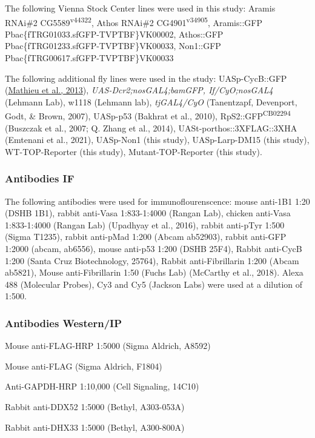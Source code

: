 \documentclass[12pt,oneside]{reedthesis}
\begin{document}
The following Vienna Stock Center lines were used in this study: Aramis RNAi\#2 CG5589\textsuperscript{v44322}, Athos RNAi\#2 CG4901\textsuperscript{v34905}, Aramis::GFP Pbac\{fTRG01033.sfGFP-TVPTBF\}VK00002, Athos::GFP Pbac\{fTRG01233.sfGFP-TVPTBF\}VK00033, Non1::GFP Pbac\{fTRG00617.sfGFP-TVPTBF\}VK00033

The following additional fly lines were used in the study: UASp-CycB::GFP (\href{https://www.ncbi.nlm.nih.gov/pmc/articles/PMC5830152/\#R25}{Mathieu et al., 2013}), \emph{UAS-Dcr2;nosGAL4;bamGFP, If/CyO;nosGAL4} (Lehmann Lab), w1118 (Lehmann lab), \emph{tjGAL4/CyO} (Tanentzapf, Devenport, Godt, \& Brown, 2007), UASp-p53 (Bakhrat et al., 2010), RpS2::GFP\textsuperscript{CB02294} (Buszczak et al., 2007; Q. Zhang et al., 2014), UASt-porthos::3XFLAG::3XHA (Emtenani et al., 2021), UASp-Non1 (this study), UASp-Larp-DM15 (this study), WT-TOP-Reporter (this study), Mutant-TOP-Reporter (this study).

\hypertarget{antibodies-if}{%
\subsubsection{Antibodies IF}\label{antibodies-if}}

The following antibodies were used for immunoflourenscence: mouse anti-1B1 1:20 (DSHB 1B1), rabbit anti-Vasa 1:833-1:4000 (Rangan Lab), chicken anti-Vasa 1:833-1:4000 (Rangan Lab) (Upadhyay et al., 2016), rabbit anti-pTyr 1:500 (Sigma T1235), rabbit anti-pMad 1:200 (Abcam ab52903), rabbit anti-GFP 1:2000 (abcam, ab6556), mouse anti-p53 1:200 (DSHB 25F4), Rabbit anti-CycB 1:200 (Santa Cruz Biotechnology, 25764), Rabbit anti-Fibrillarin 1:200 (Abcam ab5821), Mouse anti-Fibrillarin 1:50 (Fuchs Lab) (McCarthy et al., 2018). Alexa 488 (Molecular Probes), Cy3 and Cy5 (Jackson Labs) were used at a dilution of 1:500.

\hypertarget{antibodies-westernip}{%
\subsubsection{Antibodies Western/IP}\label{antibodies-westernip}}

Mouse anti-FLAG-HRP 1:5000 (Sigma Aldrich, A8592)

Mouse anti-FLAG (Sigma Aldrich, F1804)

Anti-GAPDH-HRP 1:10,000 (Cell Signaling, 14C10)

Rabbit anti-DDX52 1:5000 (Bethyl, A303-053A)

Rabbit anti-DHX33 1:5000 (Bethyl, A300-800A)
\end{document}
